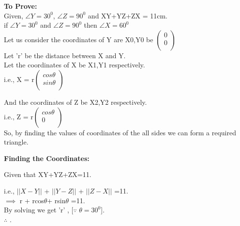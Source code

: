 \documentclass[10pt,a4paper]{report}
\begin{document}
\begin{multicols}{2}
\raggedright \textbf{To Prove:}\\ \vspace{3mm} 
   Given, $\angle{Y}=30^0$, $\angle{Z}=90^0$ and  XY+YZ+ZX = 11cm.\\ \vspace{1mm}
   if $\angle{Y}=30^0$ and $\angle{Z}=90^0$ then $\angle{X}=60^0$\\
   Let us consider the coordinates of Y are X0,Y0 be $\begin{pmatrix}
  0\\
  0 \\
 \end{pmatrix}$%
 \vspace{1mm} \\ Let 'r' be the distance between X and Y.
 \vspace{1mm} \\ Let the coordinates of X be X1,Y1 respectively.
  \\ \centering i.e., X = r$\begin{pmatrix}
  cos \theta\\
  sin \theta \\
 \end{pmatrix}$%
 \vspace{2mm}
  \\ \raggedright And the coordinates of Z be X2,Y2 respectively.
  \\ \centering i.e., Z = r$\begin{pmatrix}
  cos \theta\\
  0 \\
 \end{pmatrix}$%
 \vspace{2mm}  \\So, by finding the values of coordinates of the all sides we can form a required triangle. \\
\vspace{2mm}
\raggedright \textbf{Finding the Coordinates: } \\
        \raggedright Given that XY+YZ+ZX=11. \frenchspacing \\
        \raggedright i.e., $||X-Y||$ + $||Y-Z||$ + $||Z-X||$ =11. \\ \vspace{1mm}
 $\implies$ r + rcos$\theta$+ rsin$\theta$ =11.\\
\centering By solving we get 'r' , [$\because$ $\theta=30^0$].\\ \vspace{2mm}
 $\therefore$  .\\ 

\end{multicols}
\end{document}

